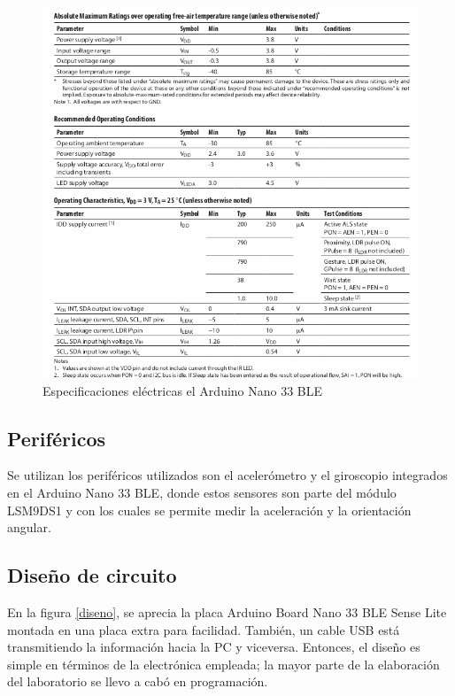     \begin{figure}[H]
        \centering
        \includegraphics[width=0.8\linewidth]{pics/electricas.png}
        \caption{Especificaciones eléctricas el Arduino Nano 33 BLE}
        \label{fig:electricas}
    \end{figure}


\subsection{Periféricos}


Se utilizan los periféricos utilizados son el acelerómetro y el giroscopio integrados en el Arduino Nano 33 BLE, donde estos sensores son parte del módulo LSM9DS1 y con los cuales se permite medir la aceleración y la orientación angular. \\


\subsection{Diseño de circuito}

En la figura \ref{diseno}, se aprecia la placa Arduino Board Nano 33 BLE Sense Lite montada en una placa extra para facilidad. También, un cable USB está transmitiendo la información hacia la PC y viceversa. Entonces, el diseño es simple en términos de la electrónica empleada; la mayor parte de la elaboración del laboratorio se llevo a cabó en programación. 


